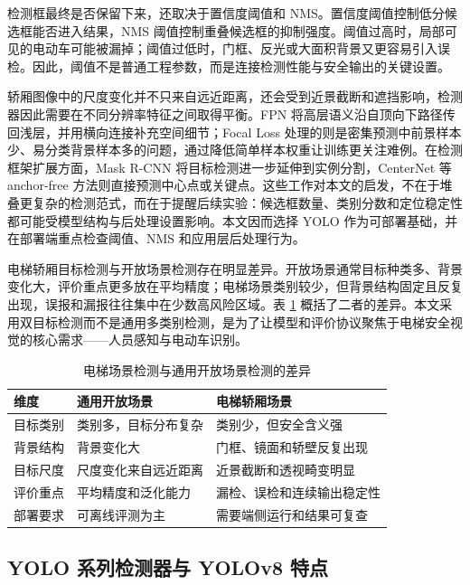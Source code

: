 检测框最终是否保留下来，还取决于置信度阈值和 NMS。置信度阈值控制低分候选框能否进入结果，NMS 阈值控制重叠候选框的抑制强度。阈值过高时，局部可见的电动车可能被漏掉；阈值过低时，门框、反光或大面积背景又更容易引入误检。因此，阈值不是普通工程参数，而是连接检测性能与安全输出的关键设置。

轿厢图像中的尺度变化并不只来自远近距离，还会受到近景截断和遮挡影响，检测器因此需要在不同分辨率特征之间取得平衡。FPN 将高层语义沿自顶向下路径传回浅层，并用横向连接补充空间细节\cite{lin2017fpn}；Focal Loss 处理的则是密集预测中前景样本少、易分类背景样本多的问题，通过降低简单样本权重让训练更关注难例\cite{lin2017focal}。在检测框架扩展方面，Mask R-CNN 将目标检测进一步延伸到实例分割\cite{he2017mask}，CenterNet 等 anchor-free 方法则直接预测中心点或关键点\cite{zhou2019centernet}。这些工作对本文的启发，不在于堆叠更复杂的检测范式，而在于提醒后续实验：候选框数量、类别分数和定位稳定性都可能受模型结构与后处理设置影响。本文因而选择 YOLO 作为可部署基础，并在部署端重点检查阈值、NMS 和应用层后处理行为。

电梯轿厢目标检测与开放场景检测存在明显差异。开放场景通常目标种类多、背景变化大，评价重点更多放在平均精度；电梯场景类别较少，但背景结构固定且反复出现，误报和漏报往往集中在少数高风险区域。表 \ref{tab:elevator_detection_diff} 概括了二者的差异。本文采用双目标检测而不是通用多类别检测，是为了让模型和评价协议聚焦于电梯安全视觉的核心需求——人员感知与电动车识别。

\begin{table}[htbp]
    \centering
    \caption{电梯场景检测与通用开放场景检测的差异}
    \label{tab:elevator_detection_diff}
    \begin{tabular}{p{2.8cm} p{4.2cm} p{4.6cm}}
        \toprule
        维度 & 通用开放场景 & 电梯轿厢场景 \\
        \midrule
        目标类别 & 类别多，目标分布复杂 & 类别少，但安全含义强 \\
        背景结构 & 背景变化大 & 门框、镜面和轿壁反复出现 \\
        目标尺度 & 尺度变化来自远近距离 & 近景截断和透视畸变明显 \\
        评价重点 & 平均精度和泛化能力 & 漏检、误检和连续输出稳定性 \\
        部署要求 & 可离线评测为主 & 需要端侧运行和结果可复查 \\
        \bottomrule
    \end{tabular}
\end{table}

\subsection{YOLO 系列检测器与 YOLOv8 特点}

